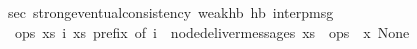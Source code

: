\begin{isabellebody}
\isamarkupfalse%
\ sec{\isacharcolon}\ strong{\isacharunderscore}eventual{\isacharunderscore}consistency\ weak{\isacharunderscore}hb\ hb\ interp{\isacharunderscore}msg\isanewline
\ \ {\isachardoublequoteopen}{\isasymlambda}ops{\isachardot}\ {\isasymexists}xs\ i{\isachardot}\ xs\ prefix\ of\ i\ {\isasymand}\ node{\isacharunderscore}deliver{\isacharunderscore}messages\ xs\ {\isacharequal}\ ops{\isachardoublequoteclose}\ {\isachardoublequoteopen}{\isasymlambda}\ x{\isachardot}\ None{\isachardoublequoteclose}
\end{isabellebody}
